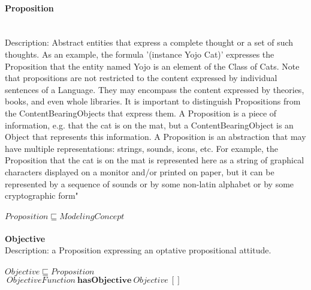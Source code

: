 \paragraph{Proposition}\\
Description: Abstract entities that express a complete thought or a set of such thoughts.  As an example, the formula '(instance Yojo Cat)' expresses the Proposition that the entity named Yojo is an element of the Class of Cats.  Note that propositions are not restricted to the content expressed by individual sentences of a Language.  They may encompass the content expressed by theories, books, and even whole libraries.  It is important to distinguish Propositions from the ContentBearingObjects that express them.  A Proposition is a piece of information, e.g. that the cat is on the mat, but a ContentBearingObject is an Object that represents this information. A Proposition is an abstraction that may have multiple representations: strings, sounds, icons, etc.  For example, the Proposition that the cat is on the mat is represented here as a string of graphical characters displayed on a monitor and/or printed on paper, but it can be represented by a sequence of sounds or by some non-latin alphabet or by some cryptographic form" \cite{Pease2011}\\
\\$ Proposition \sqsubseteq ModelingConcept$
\\\\   \textbf{Objective}\\Description: a Proposition expressing an optative propositional attitude.\\
\\$ Objective \sqsubseteq Proposition$
\\$\: ObjectiveFunction\: \textbf{hasObjective}\: Objective\:  []$

